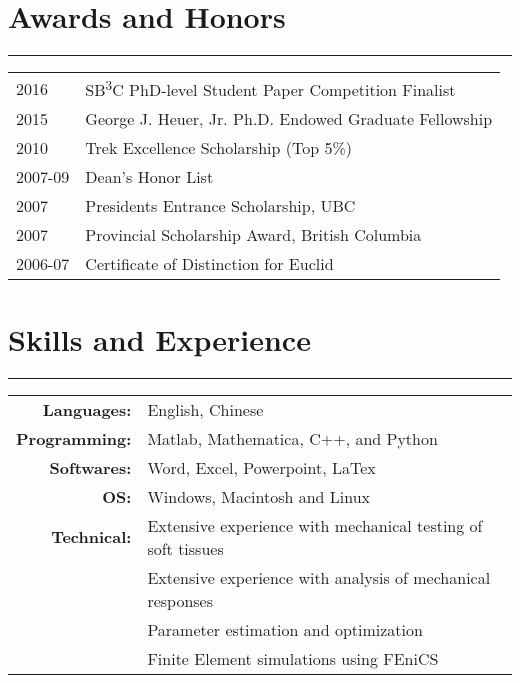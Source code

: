 \documentclass[11pt]{article}
\begin{document}




\section{Awards and Honors}
\hrule
\normalsize

\vspace{1em}

\begin{tabular}{p{0.65in} l}		
	2016	&	SB\textsuperscript{3}C PhD-level Student Paper Competition Finalist\\
	2015	&	George J. Heuer, Jr. Ph.D. Endowed Graduate Fellowship\\
	2010	&	Trek Excellence Scholarship (Top 5\%)\\
	2007-09	&	Dean’s Honor List\\
	2007	&	Presidents Entrance Scholarship, UBC\\
    2007	&	Provincial Scholarship Award, British Columbia\\
	2006-07	&	Certificate of Distinction for Euclid\\	
\end{tabular}





\section{Skills and Experience}
\hrule
\normalsize

\noindent

\begin{longtable}{p{} p{}}
\multicolumn{1}{r}{\bf Languages:}
	& English, Chinese	\\
\multicolumn{1}{r}{\bf Programming:}
	& Matlab, Mathematica, C++, and Python	\\
\multicolumn{1}{r}{\bf Softwares:}
	& Word, Excel, Powerpoint, LaTex	\\
\multicolumn{1}{r}{\bf OS:}
	& Windows, Macintosh and Linux	\\
\multicolumn{1}{r}{\bf Technical:}
	& Extensive experience with mechanical testing of soft tissues	\\
    & Extensive experience with analysis of mechanical responses	\\
    & Parameter estimation and optimization	\\
    & Finite Element simulations using FEniCS	\\
\end{longtable}
\end{document}
